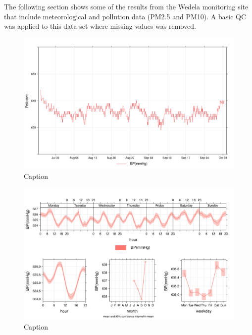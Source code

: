 \documentclass{nwureport}
\begin{document}
The following section shows some of the results from the Wedela monitoring site that include meteorological
and pollution data (PM2.5 and PM10). A basic QC was applied to this data-set where missing values was removed.

\begin{figure}[!htb]
    \centering
    \includegraphics[width=\textwidth]{images/bp_timplt_25.png}
    \caption{Caption}
    \label{fig:pm2.5_BP_timplot}
\end{figure}

\begin{figure}[!htb]
    \centering
    \includegraphics[width=\textwidth]{images/bp_25.png}
    \caption{Caption}
    \label{fig:pm2.5_BP}
\end{figure}
\end{document}
